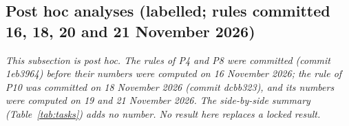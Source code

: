\documentclass[conference]{IEEEtran}
\begin{document}
\subsection{Post hoc analyses (labelled; rules committed 16, 18, 20 and 21 November 2026)}
\label{sec:res-posthoc}
\emph{This subsection is post hoc. The rules of P4 and P8 were committed (commit 1eb3964) before their numbers were computed on 16 November 2026; the rule of P10 was committed on 18 November 2026 (commit dcbb323), and its numbers were computed on 19 and 21 November 2026. The side-by-side summary (Table~\ref{tab:tasks}) adds no number. No result here replaces a locked result.}
\end{document}
